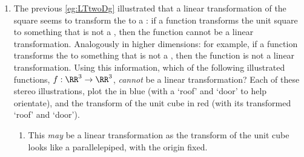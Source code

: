 \begin{example}
\begin{enumerate}[ref=\ref{eg:ltHiD}(\alph*)]
\item\label{eg:LTthreeDg}
The previous \cref{eg:LTtwoDg} illustrated that a linear transformation of the square seems to transform the  to a : if a function transforms the unit square to something that is not a , then the function cannot be a linear transformation.
Analogously in higher dimensions: for example, if a function transforms the  to something that is not a , then the function is not a linear transformation.
Using this information, which of the following illustrated functions, \(f:\RR^3\to\RR^3\), \emph{cannot} be a linear transformation?
Each of these stereo illustrations, plot the  in blue (with a `roof' and `door' to help orientate), and the transform of the unit cube in red (with its transformed `roof' and `door').
\begin{enumerate}
\item \def\unithousesize{small}
This \emph{may} be a linear transformation as the transform of the unit cube looks like a parallelepiped, with the origin fixed. 



\end{enumerate}
\end{enumerate}
\end{example}
